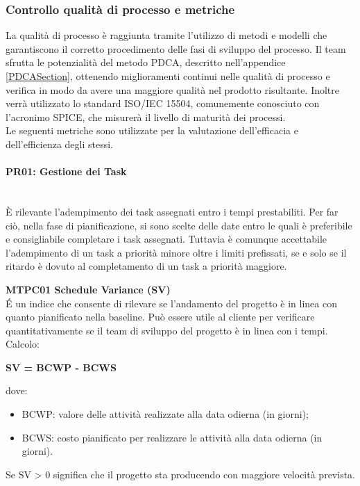 \subsubsection{Controllo qualità di processo e metriche} \label{ControlloQualita_Processo}
La qualità di processo è raggiunta tramite l'utilizzo di metodi e modelli che garantiscono il corretto procedimento delle fasi di sviluppo del processo. Il team sfrutta le potenzialità del metodo PDCA, descritto nell'appendice \ref{PDCASection}, ottenendo miglioramenti continui nelle qualità di processo e verifica in modo da avere una maggiore qualità nel prodotto risultante. Inoltre verrà utilizzato lo standard ISO/IEC 15504, comunemente conosciuto con l'acronimo SPICE, che misurerà il livello di maturità dei processi.\-\\
Le seguenti metriche sono utilizzate per la valutazione dell'efficacia e dell'efficienza degli stessi.

\paragraph{PR01: Gestione dei Task} \-\\
È rilevante l'adempimento dei task assegnati entro i tempi prestabiliti. Per far ciò, nella fase di pianificazione, si sono scelte delle date entro le quali è preferibile e consigliabile completare i task assegnati. Tuttavia è comunque accettabile l'adempimento di un task a priorità minore oltre i limiti prefissati, se e solo se il ritardo è dovuto al completamento di un task a priorità maggiore.

\begin{itemize}

	\item \textbf{MTPC01 Schedule Variance (SV)}\-\\
\'E un indice che consente di rilevare se l'andamento del progetto è in linea con quanto pianificato nella baseline\glossario. Può essere utile al cliente per verificare quantitativamente se il team di sviluppo del progetto è in linea con i tempi. \-\\
Calcolo:\-\\
\begin{center}
	\item \textbf{SV = BCWP - BCWS}
\end{center}
dove:
\begin{itemize}
	\item BCWP: valore delle attività realizzate alla data odierna (in giorni);
	\item BCWS: costo pianificato per realizzare le attività alla data odierna (in giorni).
\end{itemize}
Se SV > 0 significa che il progetto sta producendo con maggiore velocità prevista.

\end{itemize}


